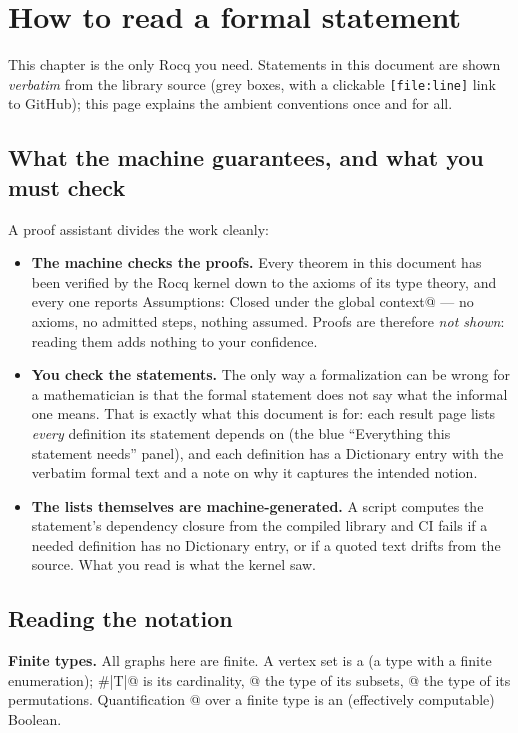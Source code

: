 \chapter{How to read a formal statement}
\label{ch:primer}

This chapter is the only Rocq you need. Statements in this document are
shown \emph{verbatim} from the library source (grey boxes, with a
clickable \texttt{[file:line]} link to GitHub); this page explains the
ambient conventions once and for all.

\section{What the machine guarantees, and what you must check}

A proof assistant divides the work cleanly:

\begin{itemize}
\item \textbf{The machine checks the proofs.} Every theorem in this
  document has been verified by the Rocq kernel down to the axioms of
  its type theory, and every one reports
  \rocqinline@Print Assumptions: Closed under the global context@ ---
  no axioms, no admitted steps, nothing assumed. Proofs are therefore
  \emph{not shown}: reading them adds nothing to your confidence.
\item \textbf{You check the statements.} The only way a formalization
  can be wrong for a mathematician is that the formal statement does
  not say what the informal one means. That is exactly what this
  document is for: each result page lists \emph{every} definition its
  statement depends on (the blue ``Everything this statement needs''
  panel), and each definition has a Dictionary entry with the verbatim
  formal text and a note on why it captures the intended notion.
\item \textbf{The lists themselves are machine-generated.} A script
  computes the statement's dependency closure from the compiled
  library and CI fails if a needed definition has no Dictionary entry,
  or if a quoted text drifts from the source. What you read is what
  the kernel saw.
\end{itemize}

\section{Reading the notation}

\textbf{Finite types.} All graphs here are finite. A vertex set is a
\rocqinline@finType@ (a type with a finite enumeration);
\rocqinline@#|T|@ is its cardinality, @ the type of
its subsets, @ the type of its permutations.
Quantification \rocqinline@[forall v : T, P v]@ over a finite type is
an (effectively computable) Boolean.

